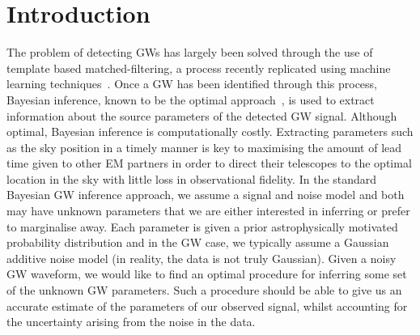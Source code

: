 \documentclass{article}
\begin{document}
%
%
%

\section{Introduction}

%
%
The problem of detecting \acp{GW} has largely been solved through the use of
template based matched-filtering, a process recently replicated using machine
learning techniques~\cite{GEORGE201864,PhysRevLett.120.141103,GebKilParHarSch}.
Once a \ac{GW} has been identified through this process, Bayesian inference,
known to be the optimal approach~\cite{2009CQGra..26o5017S}, is used to extract
information about the source parameters of the detected \ac{GW} signal. Although 
optimal, Bayesian inference is computationally costly. Extracting parameters 
such as the sky position in a timely manner is key to maximising the amount of 
lead time given to other \ac{EM} partners in order to direct their telescopes to the 
optimal location in the sky with little loss in observational fidelity.
%
%
In the standard Bayesian \ac{GW} inference approach, we assume a signal and
noise model and both may have unknown parameters that we are either interested
in inferring or prefer to marginalise away. Each parameter is given a prior
astrophysically motivated probability distribution and in the \ac{GW} case, we
typically assume a Gaussian additive noise model (in reality, the data is not
truly Gaussian). Given a noisy \ac{GW} waveform, we would like to find an
optimal procedure for inferring some set of the unknown \ac{GW} parameters.
Such a procedure should be able to give us an accurate estimate of the
parameters of our observed signal, whilst accounting for the uncertainty
arising from the noise in the data.
\end{document}
